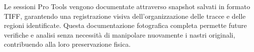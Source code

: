 Le sessioni Pro Tools vengono documentate attraverso snapshot salvati in formato TIFF, garantendo una registrazione visiva dell'organizzazione delle tracce e delle regioni identificate\cite[p. 174]{pro:scelsitapes2007}. Questa documentazione fotografica completa permette future verifiche e analisi senza necessità di manipolare nuovamente i nastri originali, contribuendo alla loro preservazione fisica.

